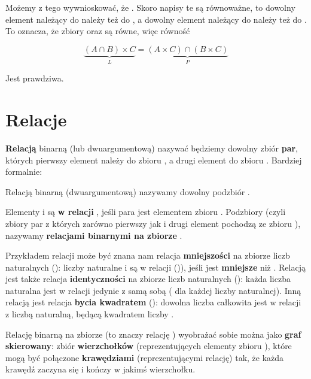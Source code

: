 Możemy z tego wywnioskować, że . Skoro napisy te są równoważne, to dowolny element należący do  należy też do , a dowolny element należący do  należy też do . To oznacza, że zbiory  oraz  są równe, więc równość

\[
    \underbrace{(A \cap B) \times C}_{L} = \underbrace{(A \times C) \cap (B \times C)}_{P} 
\]

Jest prawdziwa.

\section{Relacje}

\textbf{Relacją} binarną (lub dwuargumentową) nazywać będziemy dowolny zbiór \textbf{par}, których pierwszy element należy do zbioru , a drugi element do zbioru . Bardziej formalnie:

\begin{definition}
Relacją binarną (dwuargumentową) nazywamy dowolny podzbiór .
\end{definition}

Elementy  i  są \textbf{w relacji }, jeśli para  jest elementem zbioru . Podzbiory  (czyli zbiory par z których zarówno pierwszy jak i drugi element pochodzą ze zbioru ), nazywamy \textbf{relacjami binarnymi na zbiorze }.

Przykładem relacji może być znana nam relacja \textbf{mniejszości} na zbiorze liczb naturalnych (): liczby naturalne  i  są w relacji ()), jeśli  jest \textbf{mniejsze} niż . Relacją jest także relacja \textbf{identyczności} na zbiorze liczb naturalnych (): każda liczba naturalna jest w relacji jedynie z samą sobą ( dla każdej liczby naturalnej). Inną relacją jest relacja \textbf{bycia kwadratem} (): dowolna liczba całkowita  jest w relacji z liczbą naturalną, będącą kwadratem liczby .

Relację binarną na zbiorze  (to znaczy relację ) wyobrażać sobie można jako \textbf{graf skierowany}: zbiór \textbf{wierzchołków} (reprezentujących elementy zbioru ), które mogą być połączone \textbf{krawędziami} (reprezentującymi relację) tak, że każda krawędź zaczyna się i kończy w jakimś wierzchołku.

